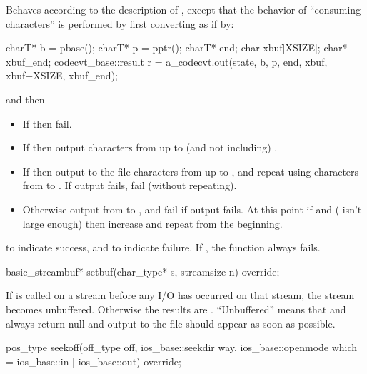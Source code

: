 \begin{itemdescr}
\pnum
\effects
Behaves according to the description of
,
except that the behavior of ``consuming characters'' is performed by first
converting as if by:
\begin{codeblock}
charT* b = pbase();
charT* p = pptr();
charT* end;
char   xbuf[XSIZE];
char*  xbuf_end;
codecvt_base::result r =
  a_codecvt.out(state, b, p, end, xbuf, xbuf+XSIZE, xbuf_end);
\end{codeblock}
and then
\begin{itemize}
\item If  then fail.
\item If  then output characters from
 up to (and not including) .
\item If  then output to the file characters from
 up to , and repeat using characters from
 to . If output fails, fail (without repeating).
\item Otherwise output from  to , and fail if output fails.
At this point if  and  ( isn't large
enough) then increase  and repeat from the beginning.
\end{itemize}

\pnum
\returns
{}
to indicate success, and
to indicate failure.
If
,
the function always fails.
\end{itemdescr}

%
\begin{itemdecl}
basic_streambuf* setbuf(char_type* s, streamsize n) override;
\end{itemdecl}

\begin{itemdescr}
\pnum
\effects
If
is called on a stream before any I/O has occurred on that stream, the
stream becomes unbuffered.
Otherwise the results are .
``Unbuffered'' means that
and
always return null
and output to the file should appear as soon as possible.
\end{itemdescr}

%
\begin{itemdecl}
pos_type seekoff(off_type off, ios_base::seekdir way,
                 ios_base::openmode which
                   = ios_base::in | ios_base::out) override;
\end{itemdecl}

